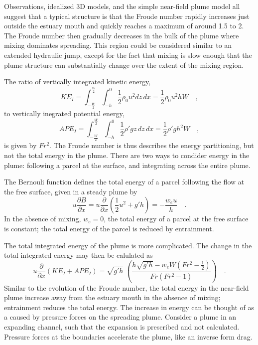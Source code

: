 \documentclass[12pt]{article}
\begin{document}
Observations, idealized 3D models, and the simple near-field plume model all suggest that a typical structure is that the Froude number rapidly increases just outside the estuary mouth and quickly reaches a maximum of around 1.5 to 2. The Froude number then gradually decreases in the bulk of the plume where mixing dominates spreading. This region could be considered similar to an extended hydraulic jump, except for the fact that mixing is slow enough that the plume structure can substantially change over the extent of the mixing region.

The ratio of vertically integrated kinetic energy, 
\begin{equation}
    KE_I = \int_{-\frac{W}{2}}^{\frac{W}{2}} \int_{-h}^{0} \frac{1}{2} \rho_0 u^2 dz \, dx = \frac{1}{2} \rho_0 u^2 h W \quad ,
\end{equation} 
to vertically inegrated potential energy, 
\begin{equation}
    APE_I = \int_{-\frac{W}{2}}^{\frac{W}{2}} \int_{-h}^{0} \frac{1}{2} \rho' g z\, dz \,dx = \frac{1}{2} \rho' g h^2 W \quad ,
\end{equation}
is given by $Fr^2$. The Froude number is thus describes the energy partitioning, but not the total energy in the plume. There are two ways to condider energy in the plume: following a parcel at the surface, and integrating across the entire plume. 

The Bernouli function defines the total energy of a parcel following the flow at the free surface, given in a steady plume by
\begin{equation}
    u \frac{\partial B}{\partial x} = u \frac{\partial }{\partial x}\left( \frac{1}{2} u^2 + g' h\right) = -\frac{w_e u}{h} \quad .
\end{equation}
In the absence of mixing, $w_e = 0$, the total energy of a parcel at the free surface is constant; the total energy of the parcel is reduced by entrainment. 

The total integrated energy of the plume is more complicated. The change in the total integrated energy may then be calulated as
\begin{equation}
    u \frac{\partial}{\partial x} \left( KE_I + APE_I \right) = \sqrt{g' h}\; \left( \frac{h \sqrt{g' h} - w_e W (Fr^2 - \frac{1}{2})}{Fr(Fr^2 - 1)}\right) \quad .
\end{equation}
Similar to the evolution of the Froude number, the total energy in the near-field plume increase away from the estuary mouth in the absence of mixing; entrainment reduces the total energy. The increase in energy can be thought of as a caused by pressure forces on the spreading plume. Consider a plume in an expanding channel, such that the expansion is prescribed and not calculated. Pressure forces at the boundaries accelerate the plume, like an inverse form drag. 
\end{document}
